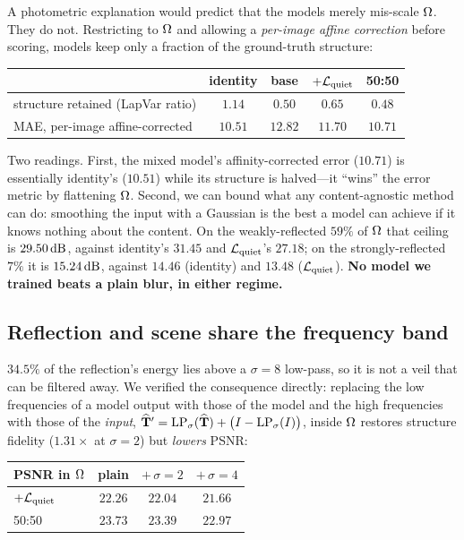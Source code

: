 A photometric explanation would predict that the models merely mis-scale $\Omega$. They do
not. Restricting to $\Omega$ and allowing a \emph{per-image affine correction} before
scoring, models keep only a fraction of the ground-truth structure:

\begin{center}
\small
\setlength{\tabcolsep}{4pt}
\begin{tabular}{@{}lcccc@{}}
\toprule
 & identity & base & $+\mathcal{L}_{\mathrm{quiet}}$ & 50:50 \\
\midrule
structure retained (LapVar ratio) & $1.14$ & $0.50$ & $\mathbf{0.65}$ & $0.48$ \\
MAE, per-image affine-corrected & $10.51$ & $12.82$ & $11.70$ & $\mathbf{10.71}$ \\
\bottomrule
\end{tabular}
\end{center}

Two readings. First, the mixed model's affinity-corrected error ($10.71$) is essentially
identity's ($10.51$) while its structure is halved---it ``wins'' the error metric by
flattening $\Omega$. Second, we can bound what any content-agnostic method can do: smoothing
the input with a Gaussian is the best a model can achieve if it knows nothing about the
content. On the weakly-reflected $59\%$ of $\Omega$ that ceiling is $29.50\,\mathrm{dB}$, against
identity's $31.45$ and $\mathcal{L}_{\mathrm{quiet}}$'s $27.18$; on the strongly-reflected $7\%$ it is
$15.24\,\mathrm{dB}$, against $14.46$ (identity) and $13.48$ ($\mathcal{L}_{\mathrm{quiet}}$). \textbf{No model we
trained beats a plain blur, in either regime.}

\subsection{Reflection and scene share the frequency band}
\label{sec:band}

$34.5\%$ of the reflection's energy lies above a $\sigma{=}8$ low-pass, so it is not a veil
that can be filtered away. We verified the consequence directly: replacing the low
frequencies of a model output with those of the model and the high frequencies with those
of the \emph{input},
$\widehat{\mathbf{T}}' = \mathrm{LP}_\sigma(\widehat{\mathbf{T}}) + \big(I-\mathrm{LP}_\sigma(I)\big)$, inside $\Omega$
restores structure fidelity ($1.31\times$ at $\sigma{=}2$) but \emph{lowers} PSNR:

\begin{center}
\small
\setlength{\tabcolsep}{4pt}
\begin{tabular}{@{}lccc@{}}
\toprule
PSNR in $\Omega$ & plain & $+\,\sigma{=}2$ & $+\,\sigma{=}4$ \\
\midrule
$+\mathcal{L}_{\mathrm{quiet}}$ & $22.26$ & $22.04$ & $21.66$ \\
50:50 & $23.73$ & $23.39$ & $22.97$ \\
\bottomrule
\end{tabular}
\end{center}

